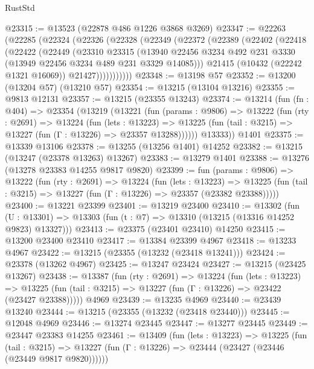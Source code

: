 \begin{lexlean}{RustStd}
\begin{coremodule}
@23315 := @13523 (@22878 @486 @1226 @3868 @3269)
@23347 := @22263
    (@22285
      (@22324
        (@22326
          (@22328
            (@22349
              (@22372
                (@22389
                  (@22402
                    (@22418
                      (@22422
                        (@22449
                          (@23310
                            @23315
                            (@13940
                              @22456
                              @3234
                              @492
                              @231
                              @3330
                              (@13949 @22456 @3234 @489 @231 @3329 @14085)))
                          @21415
                          (@10432 (@22242 @1321 @16069))
                          @21427)))))))))))
@23348 := @13198 @57
@23352 := @13200 (@13204 @57) (@13210 @57)
@23354 := @13215 (@13104 @13216)
@23355 := @9813 @12131
@23357 := @13215 (@23355 @13243)
@23374 := @13214
    (fun (fn : @404) =>
    @23354
      (@13219
        (@13221
          (fun (params : @9806) =>
          @13222
            (fun (rty : @2691) =>
            @13224
              (fun (lets : @13223) =>
              @13225 (fun (tail : @3215) => @13227 (fun (Γ : @13226) => @23357 @13288))))))
        @13333))
    @1401
@23375 := @13339 @13106
@23378 := @13255 (@13256 @1401) @14252
@23382 := @13215 (@13247 (@23378 @13263) @13267)
@23383 := @13279 @1401
@23388 := @13276 (@13278 @23383 @14255 @9817 @9820)
@23399 := fun (params : @9806) =>
  @13222
    (fun (rty : @2691) =>
    @13224
      (fun (lets : @13223) =>
      @13225 (fun (tail : @3215) => @13227 (fun (Γ : @13226) => @23357 (@23382 @23388)))))
@23400 := @13221 @23399
@23401 := @13219 @23400
@23410 := @13302
    (fun (U : @13301) => @13303 (fun (t : @7) => @13310 (@13215 (@13316 @14252 @9823) @13327)))
@23413 := @23375 (@23401 @23410) @14250
@23415 := @13200 @23400 @23410
@23417 := @13384 @23399 @4967
@23418 := @13233 @4967
@23422 := @13215 (@23355 (@13232 (@23418 @13241)))
@23424 := @23378 (@13262 @4967)
@23425 := @13247 @23424
@23427 := @13215 (@23425 @13267)
@23438 := @13387
    (fun (rty : @2691) =>
    @13224
      (fun (lets : @13223) =>
      @13225 (fun (tail : @3215) => @13227 (fun (Γ : @13226) => @23422 (@23427 @23388)))))
    @4969
@23439 := @13235 @4969
@23440 := @23439 @13240
@23444 := @13215 (@23355 (@13232 (@23418 @23440)))
@23445 := @12048 @4969
@23446 := @13274 @23445
@23447 := @13277 @23445
@23449 := @23447 @23383 @14255
@23461 := @13409
    (fun (lets : @13223) =>
    @13225
      (fun (tail : @3215) =>
      @13227 (fun (Γ : @13226) => @23444 (@23427 (@23446 (@23449 @9817 @9820))))))

\end{coremodule}
\end{lexlean}
